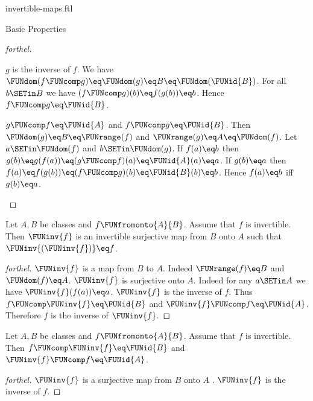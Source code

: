 \documentclass{naproche-library}
\begin{document}
\begin{smodule}[title=Invertible Maps]{invertible-maps.ftl}
\begin{sfragment}{Basic Properties}
\begin{proof}[forthel]
\begin{case}{$g$ is the inverse of $f$.}
      We have
      $\FUNdom(f \FUNcomp g)
        \eq \FUNdom(g)
        \eq B
        \eq \FUNdom(\FUNid{B})$.
      For all $b \SETin B$ we have
      $(f \FUNcomp g)(b)
        \eq f(g(b))
        \eq b$.
      Hence $f \FUNcomp g \eq \FUNid{B}$.
    \end{case}

    \begin{case}{$g \FUNcomp f \eq \FUNid{A}$ and $f \FUNcomp g \eq \FUNid{B}$.}
      Then $\FUNdom(g)
        \eq B
        \eq \FUNrange(f)$
      and $\FUNrange(g)
        \eq A
        \eq \FUNdom(f)$.
      Let $a \SETin \FUNdom(f)$ and $b \SETin \FUNdom(g)$.
      If $f(a) \eq b$ then
      $g(b)
        \eq g(f(a))
        \eq (g \FUNcomp f)(a)
        \eq \FUNid{A}(a)
        \eq a$.
      If $g(b) \eq a$ then
      $f(a)
        \eq f(g(b))
        \eq (f \FUNcomp g)(b)
        \eq \FUNid{B}(b)
        \eq b$.
      Hence $f(a) \eq b$ iff $g(b) \eq a$.
    \end{case}
  \end{proof}

  \begin{proposition}[forthel,id=FOUNDATIONS_09_8414736098000896]
    Let $A, B$ be classes and $f \FUNfromonto{A}{B}$.
    Assume that $f$ is invertible.
    Then $\FUNinv{f}$ is an invertible surjective map from $B$ onto $A$ such that $\FUNinv{(\FUNinv{f})} \eq f$.
  \end{proposition}
  \begin{proof}[forthel]
    $\FUNinv{f}$ is a map from $B$ to $A$.
    Indeed $\FUNrange(f) \eq B$ and $\FUNdom(f) \eq A$.
    $\FUNinv{f}$ is surjective onto $A$.
    Indeed for any $a \SETin A$ we have $\FUNinv{f}(f(a)) \eq a$.
    $\FUNinv{f}$ is the inverse of $f$.
    Thus $f \FUNcomp \FUNinv{f} \eq \FUNid{B}$ and $\FUNinv{f} \FUNcomp f \eq \FUNid{A}$.
    Therefore $f$ is the inverse of $\FUNinv{f}$.
  \end{proof}

  \begin{proposition}[forthel,id=FOUNDATIONS_09_4577560740495360]
    Let $A, B$ be classes and $f \FUNfromonto{A}{B}$.
    Assume that $f$ is invertible.
    Then $f \FUNcomp \FUNinv{f} \eq \FUNid{B}$ and $\FUNinv{f} \FUNcomp f \eq \FUNid{A}$.
  \end{proposition}
  \begin{proof}[forthel]
    $\FUNinv{f}$ is a surjective map from $B$ onto $A$ .
    $\FUNinv{f}$ is the inverse of $f$.
  \end{proof}


\end{sfragment}
\end{smodule}
\end{document}
